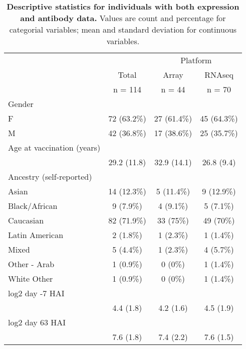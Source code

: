 \begin{table}[] 
 \centering 
 \caption{\textbf{Descriptive statistics for individuals with both expression and antibody data.} Values are count and percentage for categorial variables; mean and standard deviation for continuous variables.}\label{tab:hird_table1}
 \begin{tabular}{ l c c c }
 \toprule
  &   &  \multicolumn{ 2 }{c}{ Platform }\\ 
  & Total & Array & \gls{RNAseq} \\ 
  & n = 114 & n = 44 & n = 70 \\ 
  \midrule
 Gender &   &   &  \\ 
 \hspace{6pt}    F & 72 (63.2\%) & 27 (61.4\%) & 45 (64.3\%)\\ 
 \hspace{6pt}    M & 42 (36.8\%) & 17 (38.6\%) & 25 (35.7\%)\\ 
 Age at vaccination (years)  &   &   &  \\ 
 \hspace{6pt}   & 29.2 (11.8) & 32.9 (14.1) & 26.8 (9.4)\\ 
 Ancestry (self-reported) &   &   &  \\ 
 \hspace{6pt}    Asian & 14 (12.3\%) & 5 (11.4\%) & 9 (12.9\%)\\ 
 \hspace{6pt}    Black/African & 9 (7.9\%) & 4 (9.1\%) & 5 (7.1\%)\\ 
 \hspace{6pt}    Caucasian & 82 (71.9\%) & 33 (75\%) & 49 (70\%)\\ 
 \hspace{6pt}    Latin American & 2 (1.8\%) & 1 (2.3\%) & 1 (1.4\%)\\ 
 \hspace{6pt}    Mixed & 5 (4.4\%) & 1 (2.3\%) & 4 (5.7\%)\\ 
 \hspace{6pt}    Other - Arab & 1 (0.9\%) & 0 (0\%) & 1 (1.4\%)\\ 
 \hspace{6pt}    White Other & 1 (0.9\%) & 0 (0\%) & 1 (1.4\%)\\ 
 log2 day -7 HAI  &   &   &  \\ 
 \hspace{6pt}   & 4.4 (1.8) & 4.2 (1.6) & 4.5 (1.9)\\ 
 log2 day 63 HAI  &   &   &  \\ 
 \hspace{6pt}   & 7.6 (1.8) & 7.4 (2.2) & 7.6 (1.5)\\ 

\end{tabular}
\end{table}
